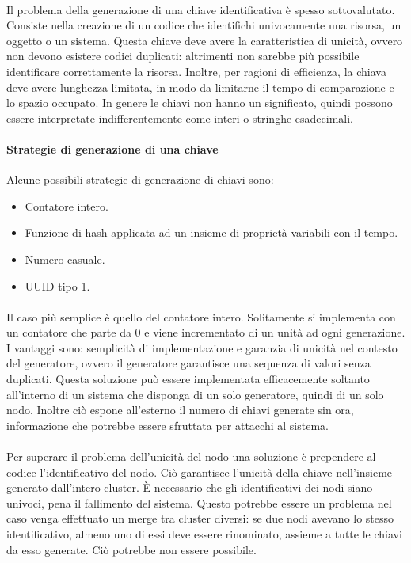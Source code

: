 \documentclass[11pt,a4paper,english]{article}
\begin{document}
\paragraph{} Il problema della generazione di una chiave identificativa è spesso sottovalutato. Consiste nella creazione di un codice che identifichi univocamente una risorsa, un oggetto o un sistema. Questa chiave deve avere la caratteristica di unicità, ovvero non devono esistere codici duplicati: altrimenti non sarebbe più possibile identificare correttamente la risorsa. Inoltre, per ragioni di efficienza, la chiava deve avere lunghezza limitata, in modo da limitarne il tempo di comparazione e lo spazio occupato. In genere le chiavi non hanno un significato, quindi possono essere interpretate indifferentemente come interi o stringhe esadecimali.  

\paragraph{Strategie di generazione di una chiave} Alcune possibili strategie di generazione di chiavi sono: \begin{itemize}
	\item Contatore intero.
	\item Funzione di hash applicata ad un insieme di proprietà variabili con il tempo.
	\item Numero casuale.
	\item UUID tipo 1.
\end{itemize}

\paragraph{} Il caso più semplice è quello del contatore intero. Solitamente si implementa con un contatore che parte da 0 e viene incrementato di un unità ad ogni generazione. I vantaggi sono: semplicità di implementazione e garanzia di unicità nel contesto del generatore, ovvero il generatore garantisce una sequenza di valori senza duplicati. Questa soluzione può essere implementata efficacemente soltanto all'interno di un sistema che disponga di un solo generatore, quindi di un solo nodo. Inoltre ciò espone all'esterno il numero di chiavi generate sin ora, informazione che potrebbe essere sfruttata per attacchi al sistema. 

\paragraph{} Per superare il problema dell'unicità del nodo una soluzione è prependere al codice l'identificativo del nodo. Ciò garantisce l'unicità della chiave nell'insieme generato dall'intero cluster. È necessario che gli identificativi dei nodi siano univoci, pena il fallimento del sistema. Questo potrebbe essere un problema nel caso venga effettuato un merge tra cluster diversi: se due nodi avevano lo stesso identificativo, almeno uno di essi deve essere rinominato, assieme a tutte le chiavi da esso generate. Ciò potrebbe non essere possibile.  
\end{document}
